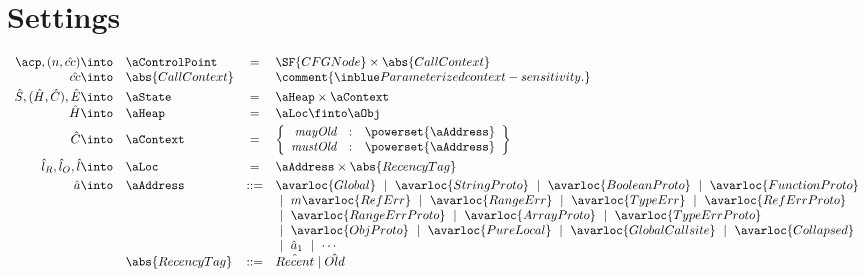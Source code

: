 \section{Settings}
\[
\begin{array}{rlcl}
\acp, (n, \hat{cc}) \into & \aControlPoint & = & \SF{CFGNode} \times \abs{CallContext} \\
\hat{cc} \into & \abs{CallContext} &  & \comment{\inblue  Parameterized context-sensitivity.} \vspace{1mm}\\

\hat{S}, (\hat{H}, \hat{C}), \hat{E} \into & \aState & = &  \aHeap \times \aContext\\
\hat{H} \into & \aHeap & = & \aLoc \finto \aObj \vspace{1mm}\\
\hat{C} \into & \aContext & = &
\left\{ \begin{array}{rcl}
\emph{mayOld} & : & \powerset{\aAddress} \\
\emph{mustOld} & : & \powerset{\aAddress} \\
\end{array} \right\} \vspace{1mm}\\

\hat{l}_R,\hat{l}_O,\hat{l} \into & \aLoc &  = & \aAddress \times \abs{RecencyTag} \vspace{1mm}\\
\hat{a} \into & \aAddress & ::= & \avarloc{Global} ~\mid~
                                \avarloc{StringProto} ~\mid~ 
                                \avarloc{BooleanProto} ~\mid~ 
                                \avarloc{FunctionProto} \\
                          & & & ~\mid~m 
                                \avarloc{RefErr} ~\mid~ 
                                \avarloc{RangeErr} ~\mid~ 
                                \avarloc{TypeErr} ~\mid~ 
                                \avarloc{RefErrProto}  \\
                          & & & ~\mid~ 
                                 \avarloc{RangeErrProto} ~\mid~ 
                                 \avarloc{ArrayProto} ~\mid~ 
                                 \avarloc{TypeErrProto} \\
                          & & & ~\mid~ 
                                 \avarloc{ObjProto} ~\mid~ 
                                 \avarloc{PureLocal} ~\mid~ 
                                 \avarloc{GlobalCallsite} ~\mid~ 
                                 \avarloc{Collapsed} \\
                          & & & ~\mid~
                                 \hat{a}_1 ~\mid~ \cdots \\
    & \abs{RecencyTag} & ::= & \hat{Recent} \mid \hat{Old} \vspace{1mm}\\


\end{array}\]
